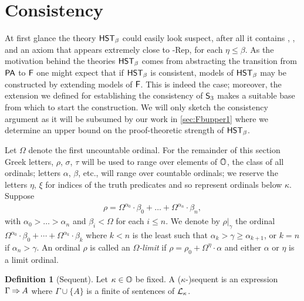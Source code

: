 \documentclass[UKenglish,cleveref,DIV=12]{scrartcl}
\theoremstyle{definition}
\newtheorem{definition}[lemma]{Definition}
\theoremstyle{definition}
\begin{document}
\section{Consistency}\label{sec:Fbconsis}
At first glance the theory $\mathsf{HST}_\beta$ could easily look suspect, after all it
contains \Del\eta, \Conec\eta, \Nec\eta and an axiom that appears
extremely close to \textT\eta-Rep, for each $\eta\le\beta$.
As the motivation behind the
theories $\mathsf{HST}_\beta$ comes from abstracting the transition from $\mathsf{PA}$ to
$\mathsf{F}$ one might expect that if $\mathsf{HST}_\beta$ is consistent, models of $\mathsf{HST}_\beta$
may be constructed by extending models
of $\mathsf{F}$. This is indeed the case; moreover, the extension we defined for
establishing the consistency of $\mathsf{S}_3$ makes a suitable base from which to start the construction. We will only sketch the consistency argument as it will be subsumed
by our work in \cref{sec:Fbupper1} where we determine an upper bound on the
proof-theoretic strength of $\mathsf{HST}_\beta$.

Let $\Omega$ denote the first uncountable ordinal. For the remainder of this
section Greek letters, $\rho$, $\sigma$, $\tau$ will be used to range over
elements of $\mathbb{O}$, the class of all ordinals; letters $\alpha$, $\beta$, etc., will
range over countable ordinals; we reserve the letters $\eta$, $\xi$ for
indices of the truth predicates and so represent ordinals below $\kappa$.
Suppose
\begin{align*}
  \rho=\Omega^{\alpha_0}\cdot\beta_0+\dots+\Omega^{\alpha_n}\cdot\beta_n,
\end{align*}
 with $\alpha_0>\dots>\alpha_n$ and $\beta_i<\Omega$ for each $i\le n$. We denote by $\rho|_\gamma$ the ordinal
$\Omega^{\alpha_0}\cdot\beta_0+\cdots+\Omega^{\alpha_k}\cdot\beta_k$ where $k<n$
is the least such that $\alpha_k>\gamma\ge\alpha_{k+1}$, or $k=n$ if
$\alpha_n>\gamma$. An ordinal $\rho$ is called an \emph{$\Omega$-limit} if $\rho=\rho_0+\Omega^\eta\cdot\alpha$ and either $\alpha$ or $\eta$ is a
limit ordinal.

\begin{definition}[Sequent]
	Let \( \kappa \in \mathbb{O} \) be fixed. 
	A (\( \kappa \)-)sequent is an expression \( \Gamma \mathbin\Rightarrow A \) where \( \Gamma \cup \{ A \} \) is a finite of sentences of \( \mathcal{L}_\kappa \).
\end{definition}
\end{document}
